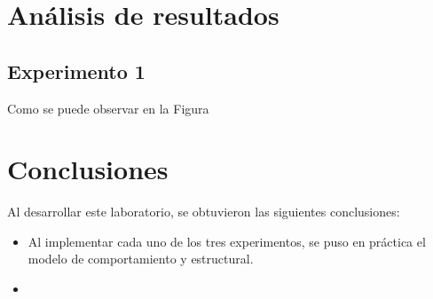\documentclass[journal,trans]{IEEEtran}
\begin{document}
	
	\section{Análisis de resultados} 
	
	\subsection {Experimento 1}
	Como se puede observar en la Figura
	
	
	
	\section{Conclusiones}
	Al desarrollar este laboratorio, se obtuvieron las siguientes conclusiones:
	
	
	\begin{itemize}
		\item Al implementar cada uno de los tres experimentos, se puso en práctica el modelo de comportamiento y estructural.
		\item 
	\end{itemize}
	
\end{document}
